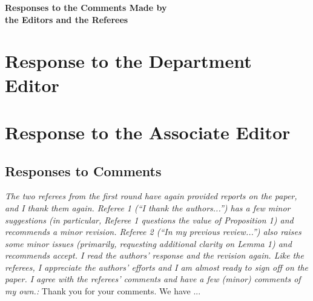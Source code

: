 \documentclass[11pt]{article}
\newcommand{\1}{\ensuremath{\mathbf{1}}} %
\theoremstyle{thm-sf}
\begin{document}
	\begin{center} {\Large {\sffamily\bfseries Responses to the Comments Made by \\
				the Editors and the Referees}}
	\end{center}
	
	\bigskip
	
	\section{Response to the Department Editor}
	
	
	
	\section{Response to the Associate Editor}
	
	\subsection{Responses to Comments}
	{\it The two referees from the first round have again provided reports on the paper, and I thank them again. Referee 1 (“I thank the authors...”) has a few minor suggestions (in particular, Referee 1 questions the value of Proposition 1) and recommends a minor revision. Referee 2 (“In my previous review...”) also raises some minor issues (primarily, requesting additional clarity on Lemma 1) and recommends accept.
		I read the authors’ response and the revision again. Like the referees, I appreciate the authors’ efforts and I am almost ready to sign off on the paper. I agree with the referees’ comments and have a few (minor) comments of my own.:
	} 
\newline
\newline
Thank you for your comments. We have ...
\end{document}
